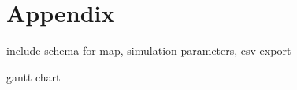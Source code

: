 \appendix
\section{Appendix}

include schema for map, simulation parameters, csv export

gantt chart